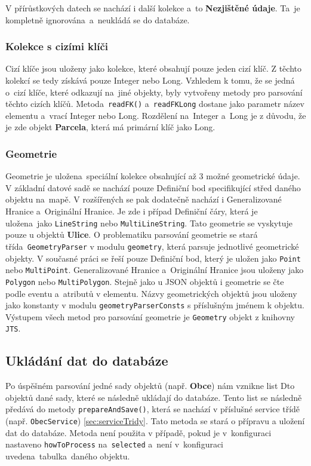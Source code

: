 V přírůstkových datech se nachází i další kolekce a~to \textbf{Nezjištěné údaje}.
Ta~je kompletně ignorována~a~neukládá se do databáze.

\subsubsection*{Kolekce s cizími klíči}
Cizí klíče jsou uloženy jako kolekce, které obsahují pouze jeden cizí klíč.
Z těchto kolekcí se tedy získává pouze Integer nebo Long.
Vzhledem k tomu, že se jedná o~cizí klíče, které odkazují na~jiné objekty,
byly vytvořeny metody pro parsování těchto cizích klíčů.
Metoda~\texttt{readFK()} a~\texttt{readFKLong} dostane jako parametr název elementu a~vrací Integer nebo Long.
Rozdělení na~Integer a~Long je z důvodu, že je zde objekt \textbf{Parcela}, která má primární klíč jako Long.

\subsubsection*{Geometrie}
Geometrie je uložena~speciální kolekce obsahující až 3 možné geometrické údaje.
V základní datové sadě se nachází pouze Definiční bod specifikující střed daného objektu na~mapě.
V rozšířených se pak dodatečně nachází i Generalizované Hranice a~Originální Hranice.
Je zde i případ Definiční čáry, která je uložena~jako \texttt{LineString} nebo \texttt{MultiLineString}.
Tato geometrie se vyskytuje pouze u objektů \textbf{Ulice}.
O problematiku parsování geometrie se stará třída~\texttt{GeometryParser} v modulu \texttt{geometry}, která parsuje jednotlivé geometrické objekty.
V současné práci se řeší pouze Definiční bod, který je uložen jako \texttt{Point} nebo \texttt{MultiPoint}.
Generalizované Hranice a~Originální Hranice jsou uloženy jako \texttt{Polygon} nebo \texttt{MultiPolygon}.
Stejně jako u JSON objektů i geometrie se čte podle eventu a~atributů v elementu.
Názvy geometrických objektů jsou uloženy jako konstanty v modulu \texttt{geometryParserConsts} s příslušným jménem k objektu.
Výstupem všech metod pro parsování geometrie je \texttt{Geometry} objekt z knihovny \texttt{JTS}.

\newpage

\subsection{Ukládání dat do databáze}
Po úspěšném parsování jedné sady objektů (např. \textbf{Obce}) nám vznikne list Dto objektů
dané sady, které se následně ukládají do databáze. Tento list se následně předává do metody \texttt{prepareAndSave()},
která se nachází v příslušné service třídě (např. \texttt{ObecService}) \ref{sec:serviceTridy}.
Tato metoda se stará o přípravu a uložení dat do databáze.
Metoda není použita v případě, pokud je v~konfiguraci nastaveno \texttt{howToProcess} na~\texttt{selected}
a~není v~konfiguraci uvedena~tabulka~daného objektu.

